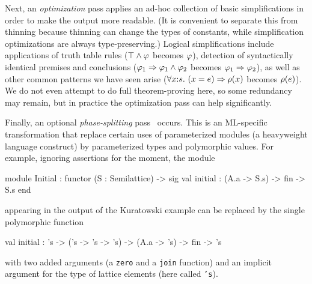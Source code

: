 Next, an \emph{optimization} pass applies an ad-hoc collection of
basic simplifications in order to make the output more readable. (It
is convenient to separate this from thinning because thinning can
change the types of constants, while simplification optimizations are
always type-preserving.)
%
%
%
Logical simplifications include applications of truth table rules
($\top\land \varphi$ becomes $\varphi$), detection of syntactically
identical premises and conclusions
($\varphi_1\Rightarrow \varphi_1\land \varphi_2$ becomes
$\varphi_1\Rightarrow \varphi_2$), as well as other common patterns we have
seen arise
($\forall x{:}s.\ (x = e)\Rightarrow \rho(x)$ becomes
$\rho(e)$). We do not even attempt to do full theorem-proving here,
so some redundancy may remain, but in practice the optimization pass
can help significantly.

Finally, an optional \emph{phase-splitting} pass~\cite{harper+:popl90}
occurs. This is an ML-specific transformation that replace certain
uses of parameterized modules (a heavyweight language construct) by
parameterized types and polymorphic values. For example, ignoring
assertions for the moment, the module
\begin{source}
module Initial : functor (S : Semilattice) ->
                    sig
                      val initial : (A.a -> S.s) -> fin -> S.s
                    end	
\end{source}   
appearing in the output of the Kuratowski example can be replaced by the single polymorphic function
\begin{source}
val initial : 's -> ('s -> 's -> 's) -> (A.a -> 's) -> fin -> 's	
\end{source}
with two added arguments (a \texttt{zero} and a \texttt{join} function) and an implicit argument for the type of lattice elements (here called \texttt{'s}).

\label{sec:typechecking}



